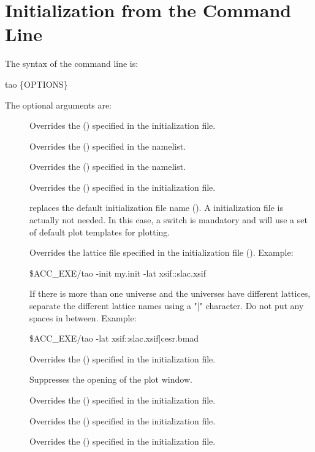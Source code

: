 \section{Initialization from the Command Line}
\label{s:command.line} 

The syntax of the command line is:
\begin{example}
  tao \{OPTIONS\}
\end{example}
The optional arguments are:
  \begin{description}
  \item[] \Newline
Overrides the  () specified in the
\tao initialization file.
  \item[] \Newline
Overrides the  () specified in the
 namelist.
  \item[] \Newline
Overrides the  () specified in the
 namelist.
  \item[] \Newline
Overrides the  () specified in the
\tao initialization file.
  \item[] \Newline
replaces the default initialization file name ().
A \tao initialization file is actually not needed. In this case, a
 switch is mandatory and \tao will use a set of default plot
templates for plotting.
  \item[] \Newline
Overrides the 
lattice file specified in the \tao initialization file
(). Example:
\begin{example}
  \$ACC_EXE/tao -init my.init -lat xsif::slac.xsif
\end{example}
If there is more than one universe and the universes have different
lattices, separate the different lattice names using a "|" character.
Do not put any spaces in between. Example:
\begin{example}
  \$ACC_EXE/tao -lat xsif::slac.xsif|cesr.bmad
\end{example}
  \item[] \Newline
Overrides the  () specified in the
\tao initialization file.
  \item[] \Newline
Suppresses the opening of the plot window.
  \item[] \Newline
Overrides the  () specified in the
\tao initialization file.
  \item[]
Overrides the  () specified in the
\tao initialization file.
  \item[] \Newline
Overrides the  () specified in the
\tao initialization file.

\end{description}

